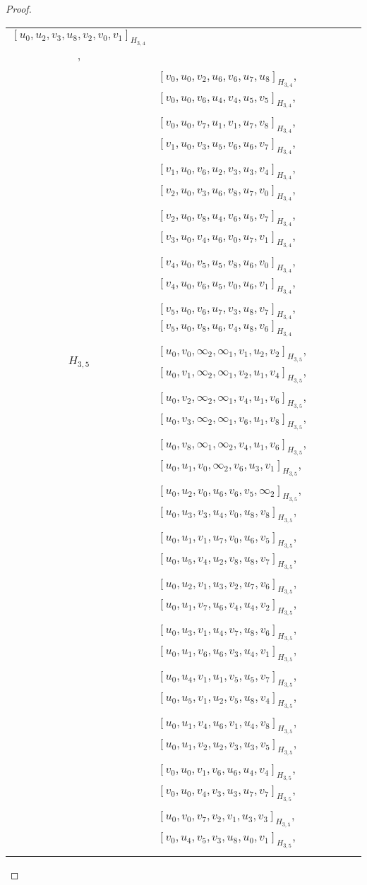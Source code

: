 \begin{subappendices}
\begin{proof}
{\begin{longtable}{|c|l|}
  $[u_0, u_2, v_3, u_8, v_2, v_0, v_1]_{H_{3,4}}$, \\* &
  $[v_0, u_0, v_2, u_6, v_6, u_7, u_8]_{H_{3,4}}$,
  $[v_0, u_0, v_6, u_4, v_4, u_5, v_5]_{H_{3,4}}$, \\* &
  $[v_0, u_0, v_7, u_1, v_1, u_7, v_8]_{H_{3,4}}$,
  $[v_1, u_0, v_3, u_5, v_6, u_6, v_7]_{H_{3,4}}$, \\* &
  $[v_1, u_0, v_6, u_2, v_3, u_3, v_4]_{H_{3,4}}$,
  $[v_2, u_0, v_3, u_6, v_8, u_7, v_0]_{H_{3,4}}$, \\* &
  $[v_2, u_0, v_8, u_4, v_6, u_5, v_7]_{H_{3,4}}$,
  $[v_3, u_0, v_4, u_6, v_0, u_7, v_1]_{H_{3,4}}$, \\* &
  $[v_4, u_0, v_5, u_5, v_8, u_6, v_0]_{H_{3,4}}$,
  $[v_4, u_0, v_6, u_5, v_0, u_6, v_1]_{H_{3,4}}$, \\* &
  $[v_5, u_0, v_6, u_7, v_3, u_8, v_7]_{H_{3,4}}$,
  $[v_5, u_0, v_8, u_6, v_4, u_8, v_6]_{H_{3,4}}$
\\ \hline
$H_{3,5}$ &
  $[u_0, v_0, \infty_2, \infty_1, v_1, u_2, v_2]_{H_{3,5}}$,
  $[u_0, v_1, \infty_2, \infty_1, v_2, u_1, v_4]_{H_{3,5}}$, \\* &
  $[u_0, v_2, \infty_2, \infty_1, v_4, u_1, v_6]_{H_{3,5}}$,
  $[u_0, v_3, \infty_2, \infty_1, v_6, u_1, v_8]_{H_{3,5}}$, \\* &
  $[u_0, v_8, \infty_1, \infty_2, v_4, u_1, v_6]_{H_{3,5}}$,
  $[u_0, u_1, v_0, \infty_2, v_6, u_3, v_1]_{H_{3,5}}$, \\* &
  $[u_0, u_2, v_0, u_6, v_6, v_5, \infty_2]_{H_{3,5}}$,
  $[u_0, u_3, v_3, u_4, v_0, u_8, v_8]_{H_{3,5}}$, \\* &
  $[u_0, u_1, v_1, u_7, v_0, u_6, v_5]_{H_{3,5}}$,
  $[u_0, u_5, v_4, u_2, v_8, u_8, v_7]_{H_{3,5}}$, \\* &
  $[u_0, u_2, v_1, u_3, v_2, u_7, v_6]_{H_{3,5}}$,
  $[u_0, u_1, v_7, u_6, v_4, u_4, v_2]_{H_{3,5}}$, \\* &
  $[u_0, u_3, v_1, u_4, v_7, u_8, v_6]_{H_{3,5}}$,
  $[u_0, u_1, v_6, u_6, v_3, u_4, v_1]_{H_{3,5}}$, \\* &
  $[u_0, u_4, v_1, u_1, v_5, u_5, v_7]_{H_{3,5}}$,
  $[u_0, u_5, v_1, u_2, v_5, u_8, v_4]_{H_{3,5}}$, \\* &
  $[u_0, u_1, v_4, u_6, v_1, u_4, v_8]_{H_{3,5}}$,
  $[u_0, u_1, v_2, u_2, v_3, u_3, v_5]_{H_{3,5}}$, \\* &
  $[v_0, u_0, v_1, v_6, u_6, u_4, v_4]_{H_{3,5}}$,
  $[v_0, u_0, v_4, v_3, u_3, u_7, v_7]_{H_{3,5}}$, \\* &
  $[u_0, v_0, v_7, v_2, v_1, u_3, v_3]_{H_{3,5}}$,
  $[v_0, u_4, v_5, v_3, u_8, u_0, v_1]_{H_{3,5}}$, \\* &

\end{longtable}}
\end{proof}
\end{subappendices}
